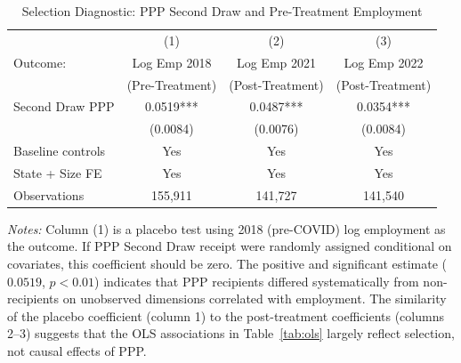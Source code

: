 \begin{table}[H]
\centering
\caption{Selection Diagnostic: PPP Second Draw and Pre-Treatment Employment}
\label{tab:selection}
\begin{threeparttable}
\begin{tabular}{l*{3}{c}}
\toprule
 & (1) & (2) & (3) \\
Outcome: & Log Emp 2018 & Log Emp 2021 & Log Emp 2022 \\
 & (Pre-Treatment) & (Post-Treatment) & (Post-Treatment) \\
\midrule
Second Draw PPP & 0.0519*** & 0.0487*** & 0.0354*** \\
 & (0.0084) & (0.0076) & (0.0084) \\
\addlinespace
Baseline controls & Yes & Yes & Yes \\
State + Size FE & Yes & Yes & Yes \\
\addlinespace
Observations & 155,911 & 141,727 & 141,540 \\
\bottomrule
\end{tabular}
\begin{tablenotes}[flushleft]
\small
\item \textit{Notes:} Column (1) is a placebo test using 2018 (pre-COVID) log employment as the outcome. If PPP Second Draw receipt were randomly assigned conditional on covariates, this coefficient should be zero. The positive and significant estimate ($0.0519$, $p < 0.01$) indicates that PPP recipients differed systematically from non-recipients on unobserved dimensions correlated with employment. The similarity of the placebo coefficient (column 1) to the post-treatment coefficients (columns 2--3) suggests that the OLS associations in Table~\ref{tab:ols} largely reflect selection, not causal effects of PPP.
\end{tablenotes}
\end{threeparttable}
\end{table}
